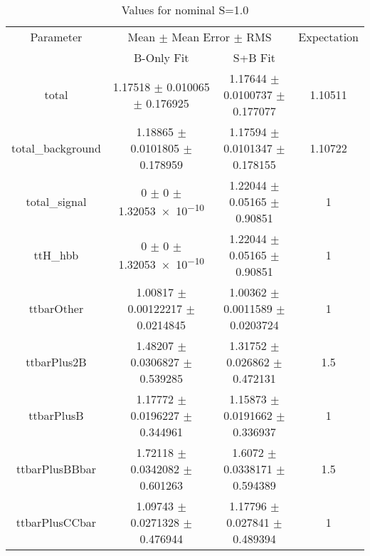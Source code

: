 \begin{table}
\centering
\caption{Values for nominal S=1.0}
\begin{tabular}{cccc}
\toprule
Parameter & \multicolumn{2}{c}{Mean $\pm$ Mean Error $\pm$ RMS} & Expectation\\
 & B-Only Fit & S+B Fit & \\
\midrule
total & \num{1.17518} $\pm$ \num{0.010065} $\pm$ \num{0.176925} & \num{1.17644} $\pm$ \num{0.0100737} $\pm$ \num{0.177077} & \num{1.10511}\\
total\_background & \num{1.18865} $\pm$ \num{0.0101805} $\pm$ \num{0.178959} & \num{1.17594} $\pm$ \num{0.0101347} $\pm$ \num{0.178155} & \num{1.10722}\\
total\_signal & \num{0} $\pm$ \num{0} $\pm$ \num{1.32053e-10} & \num{1.22044} $\pm$ \num{0.05165} $\pm$ \num{0.90851} & \num{1}\\
ttH\_hbb & \num{0} $\pm$ \num{0} $\pm$ \num{1.32053e-10} & \num{1.22044} $\pm$ \num{0.05165} $\pm$ \num{0.90851} & \num{1}\\
ttbarOther & \num{1.00817} $\pm$ \num{0.00122217} $\pm$ \num{0.0214845} & \num{1.00362} $\pm$ \num{0.0011589} $\pm$ \num{0.0203724} & \num{1}\\
ttbarPlus2B & \num{1.48207} $\pm$ \num{0.0306827} $\pm$ \num{0.539285} & \num{1.31752} $\pm$ \num{0.026862} $\pm$ \num{0.472131} & \num{1.5}\\
ttbarPlusB & \num{1.17772} $\pm$ \num{0.0196227} $\pm$ \num{0.344961} & \num{1.15873} $\pm$ \num{0.0191662} $\pm$ \num{0.336937} & \num{1}\\
ttbarPlusBBbar & \num{1.72118} $\pm$ \num{0.0342082} $\pm$ \num{0.601263} & \num{1.6072} $\pm$ \num{0.0338171} $\pm$ \num{0.594389} & \num{1.5}\\
ttbarPlusCCbar & \num{1.09743} $\pm$ \num{0.0271328} $\pm$ \num{0.476944} & \num{1.17796} $\pm$ \num{0.027841} $\pm$ \num{0.489394} & \num{1}\\
\bottomrule
\end{tabular}
\end{table}